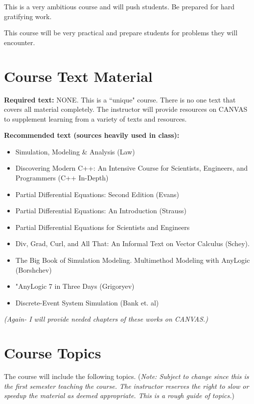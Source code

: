 \documentclass[paper=letter, fontsize=12pt]{article}
\begin{document}
This is a very ambitious course and will push students. Be prepared for hard gratifying work.

This course will be very practical and prepare students for problems they will encounter.



\section{Course Text Material}
\textcolor{myRed}{\textbf{Required text:}} NONE. This is a ``unique" course. There is no one text that covers all material completely. The instructor will provide resources on CANVAS to supplement learning from a variety of texts and resources.

\textcolor{myRed}{\textbf{Recommended text (sources heavily used in class):}}
\begin{itemize}\setlength\itemsep{-0.6em}
	\item Simulation, Modeling \& Analysis (Law)
	\item Discovering Modern C++: An Intensive Course for Scientists, Engineers, and Programmers (C++ In-Depth)
	\item Partial Differential Equations: Second Edition (Evans)
	\item Partial Differential Equations: An Introduction (Strauss)
	\item Partial Differential Equations for Scientists and Engineers
	\item Div, Grad, Curl, and All That: An Informal Text on Vector Calculus (Schey).
	\item The Big Book of Simulation Modeling. Multimethod Modeling with AnyLogic (Borshchev)
	\item"AnyLogic 7 in Three Days (Grigoryev)
	\item Discrete-Event System Simulation (Bank et. al)
\end{itemize}
\textit{(Again- I will provide needed chapters of these works on CANVAS.)}


\section{Course Topics}

The course will include the following topics. (\textit{Note: Subject to change since this is the first semester teaching the course. The instructor reserves the right to slow or speedup the material as deemed appropriate. This is a rough guide of topics.})
\end{document}
